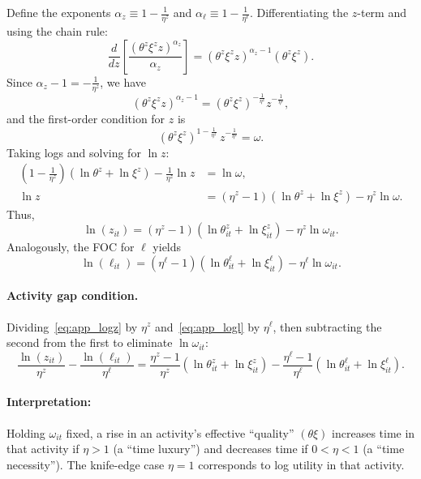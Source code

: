 \documentclass[12pt]{article}
\begin{document}
Define the exponents $\alpha_z \equiv 1-\frac{1}{\eta^z}$ and $\alpha_\ell\equiv 1-\frac{1}{\eta^\ell}$. Differentiating the $z$-term and using the chain rule:
\[
\frac{d}{dz}\left[\frac{(\theta^z\xi^z z)^{\alpha_z}}{\alpha_z}\right]
=(\theta^z\xi^z z)^{\alpha_z-1}(\theta^z\xi^z).
\]
Since $\alpha_z-1=-\frac{1}{\eta^z}$, we have
\[
(\theta^z\xi^z z)^{\alpha_z-1}=(\theta^z\xi^z)^{-\frac{1}{\eta^z}}z^{-\frac{1}{\eta^z}},
\]
and the first-order condition for $z$ is
\[
(\theta^z\xi^z)^{1-\frac{1}{\eta^z}}\,z^{-\frac{1}{\eta^z}}=\omega.
\]
Taking logs and solving for $\ln z$:
\begin{align*}
\left(1-\frac{1}{\eta^z}\right)(\ln\theta^z+\ln\xi^z)-\frac{1}{\eta^z}\ln z &= \ln\omega,\\
\ln z &= (\eta^z-1)(\ln\theta^z+\ln\xi^z)-\eta^z\ln\omega.
\end{align*}
Thus,
\begin{equation}
\label{eq:app_logz}
\ln(z_{it})
=
(\eta^z-1)\left(\ln\theta_{it}^z+\ln\xi_{it}^z\right)-\eta^z\ln\omega_{it}.
\end{equation}
Analogously, the FOC for $\ell$ yields
\begin{equation}
\label{eq:app_logl}
\ln(\ell_{it})
=
(\eta^\ell-1)\left(\ln\theta_{it}^\ell+\ln\xi_{it}^\ell\right)-\eta^\ell\ln\omega_{it}.
\end{equation}

\paragraph{Activity gap condition.} \label{app:gap}
Dividing~\eqref{eq:app_logz} by $\eta^z$ and~\eqref{eq:app_logl} by $\eta^\ell$, then subtracting the second from the first to eliminate $\ln\omega_{it}$:
\begin{equation}
\label{eq:app_gap}
\frac{\ln(z_{it})}{\eta^z}-\frac{\ln(\ell_{it})}{\eta^\ell}
=
\frac{\eta^z-1}{\eta^z}\left(\ln\theta_{it}^z+\ln\xi_{it}^z\right)
-
\frac{\eta^\ell-1}{\eta^\ell}\left(\ln\theta_{it}^\ell+\ln\xi_{it}^\ell\right).
\end{equation}

\paragraph{Interpretation:}
Holding $\omega_{it}$ fixed, a rise in an activity's effective ``quality'' $(\theta\xi)$ increases time in that activity if $\eta>1$ (a ``time luxury'') and decreases time if $0<\eta<1$ (a ``time necessity''). The knife-edge case $\eta=1$ corresponds to log utility in that activity.
\end{document}
